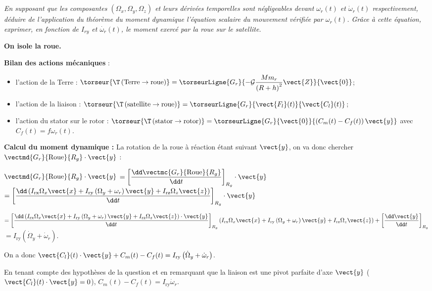 \subparagraph{\label{q_13}}\textit{
  En supposant que les composantes $\left(\Omega_x,\Omega_y,\Omega_z\right)$ et leurs dérivées temporelles sont
  négligeables devant $\omega_r(t)$ et $\dot{\omega}_r(t)$ respectivement, déduire de l'application du
  théorème du moment dynamique l'équation scalaire du mouvement vérifiée
  par $\omega_r(t)$. Grâce à cette équation, exprimer, en fonction de $I_{ry}$ et $\dot{\omega_r}(t)$, le moment exercé par la roue sur le satellite.}
\ifprof
\begin{corrige}
\textbf{On isole la roue.}

\textbf{Bilan des actions mécaniques} :
\begin{itemize}
\item l'action de la Terre : $
\torseur{\T\left(\text{Terre}\to \text{roue}\right)}=\torseurLigne{G_r}{-\mathcal{G}\dfrac{Mm_r}{\left(R+h\right)^2}\vect{Z}}{\vect{0}}$;   
\item l'action de la liaison : 
$\torseur{\T\left(\text{satellite}\to \text{roue}\right)}=\torseurLigne{G_r}{\vect{F_l}(t)}{\vect{C_l}(t)} $;
  \item l'action du stator sur le rotor :
  $\torseur{\T\left(\text{stator}\to \text{rotor}\right)}=\torseurLigne{G_r}{\vect{0}}{\left(C_m(t)-C_f(t)\right)\vect{y}}
$ avec $C_f (t)=f \omega_r(t)$.
\end{itemize}

\textbf{Calcul du moment dynamique :}
La rotation de la roue à réaction étant suivant $\vect{y}$, on va donc chercher $\vectmd{G_r}{\text{Roue}}{R_g}\cdot \vect{y}$ :

$\vectmd{G_r}{\text{Roue}}{R_g}\cdot \vect{y}$ 
$=\left[\dfrac{\dd \vectmc{G_r}{\text{Roue}}{R_g}}{\dd t}\right]_{R_g}\cdot \vect{y}$ 
$=\left[ \dfrac{\dd   \left( I_{\text{rx}} \Omega_x \vect{x}+  I_{\text{ry}}\left( \Omega_y + \omega_r \right) \vect{y}+  I_{\text{rz}}\Omega_z \vect{z} \right)}{\dd t}\right]_{R_g}\cdot \vect{y}$ 

$=\left[ \dfrac{\dd   \left( I_{\text{rx}} \Omega_x \vect{x}+  I_{\text{ry}}\left( \Omega_y + \omega_r \right) \vect{y}+  I_{\text{rz}}\Omega_z \vect{z} \right)\cdot \vect{y}}{\dd t}\right]_{R_g}
\left( I_{\text{rx}} \Omega_x \vect{x}+  I_{\text{ry}}\left( \Omega_y + \omega_r \right) \vect{y}+  I_{\text{rz}}\Omega_z \vect{z} \right) +\left[ \dfrac{\dd   \vect{y}}{\dd t}\right]_{R_g}$ 
$ =I_{\text{ry}}\left( \dot{\Omega}_y + \dot{\omega}_r \right)$.

On a donc $\vect{C_l}(t)\cdot \vect{y} + C_m(t)-C_f(t)  =  I_{\text{ry}}\left( \dot{\Omega}_y + \dot{\omega}_r \right)$.


En tenant compte des hypothèses de la question et en remarquant que la liaison est une pivot parfaite d'axe $\vect{y}$ ($\vect{C_l}(t)\cdot\vect{y} = 0$), 
$C_m(t)-C_f(t) = I_{\text{ry}}\dot{\omega}_r$.


\end{corrige}
\else
\fi


